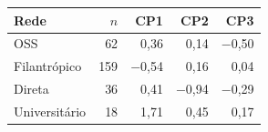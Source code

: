 \begin{tabular}{lrrrr}
\toprule
Rede & $n$ & CP1 & CP2 & CP3 \\
\midrule
OSS & 62 & 0,36 & 0,14 & \ensuremath{-}0,50 \\
Filantrópico & 159 & \ensuremath{-}0,54 & 0,16 & 0,04 \\
Direta & 36 & 0,41 & \ensuremath{-}0,94 & \ensuremath{-}0,29 \\
Universitário & 18 & 1,71 & 0,45 & 0,17 \\
\bottomrule
\end{tabular}
